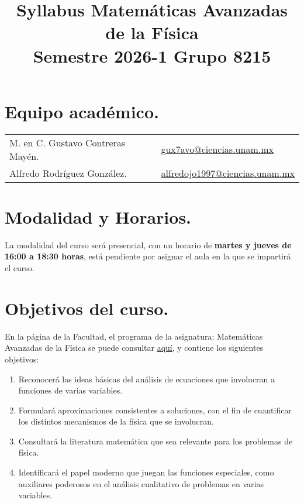 \documentclass[12pt]{article}
\title{Syllabus Matemáticas Avanzadas de la Física \\ \large{Semestre 2026-1 \hspace{3cm} Grupo 8215}\vspace{-3ex}}
\author{}
\date{ }
\numberwithin{equation}{section}
\begin{document}
\maketitle
\vspace{-2.5cm}

\section{Equipo académico.}

\begin{table}[H]
\renewcommand{\arraystretch}{1.2}
\begin{tabular}{l l}
M. en C. Gustavo Contreras Mayén. & \href{mailto:gux7avo@ciencias.unam.mx}{gux7avo@ciencias.unam.mx} \\
Alfredo Rodríguez González. & \href{mailto:alfredojo1997@ciencias.unam.mx}{alfredojo1997@ciencias.unam.mx}
\end{tabular}
\end{table}

\section{Modalidad y Horarios.}

La modalidad del curso será presencial, con un horario de \textbf{martes y jueves de 16:00 a 18:30 horas}, está pendiente por asignar el aula en la que se impartirá el curso.

\section{Objetivos del curso.}

En la página de la Facultad, el programa de la asignatura: Matemáticas Avanzadas de la Física se puede consultar 
\href{https://www.fciencias.unam.mx/sites/default/files/temario/610.pdf}{aquí}, y contiene los siguientes objetivos:
\begin{enumerate}
\item Reconocerá las ideas básicas del análisis de ecuaciones que involucran a funciones de varias variables.
\item Formulará aproximaciones consistentes a soluciones, con el fin de cuantificar los distintos mecanismos de la física que se involucran.
\item Consultará la literatura matemática que sea relevante para los problemas de física.
\item Identificará el papel moderno que juegan las funciones especiales, como auxiliares poderosos en el análisis cualitativo de problemas en varias variables.
\end{enumerate}
\end{document}
